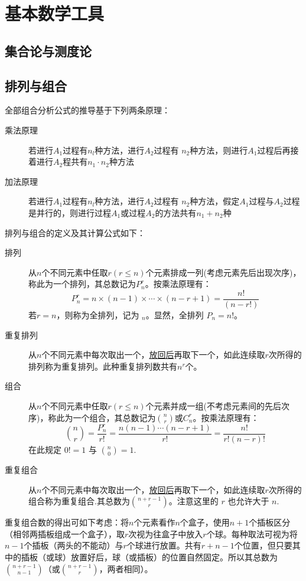 \chapter{基本数学工具}

\section{集合论与测度论}



\section{排列与组合}

全部组合分析公式的推导基于下列两条原理：
\begin{description}
  \item[乘法原理] 若进行$A_1$过程有$n_l$种方法，进行$A_2$过程有 $n_2$种方法，则进行$A_1$过程后再接着进行$A_2$程共有$n_1 \cdot  n_2$种方法
  \item[加法原理] 若进行$A_1$过程有$n_l$种方法，进行$A_2$过程有 $n_2$种方法，假定$A_1$过程与$A_2$过程是并行的，则进行过程$A_1$或过程$A_2$的方法共有$n_1 +n_2$种
\end{description}

排列与组合的定义及其计算公式如下：
\begin{description}
  \item[排列] 从$n$个不同元素中任取$r (r \le n)$个元素排成一列(考虑元素先后出现次序)，称此为一个排列，其总数记为$P_n^r$。按乘法原理有：
    \[ P_n^r = n \times (n - 1) \times \dotsb \times (n - r + 1) = \frac{n!}{(n - r!)} \]
    若$r = n$，则称为全排列，记为 $_n$。显然，全排列 $P_n = n!$。
  \item[重复排列] 从$n$个不同元素中每次取出一个，\underline{放回后}再取下一个，如此连续取$r$次所得的排列称为重复排列。此种重复排列数共有$n^r$个。
  \item[组合] 从$n$个不同元素中任取$r (r \le n)$个元素并成一组(不考虑元素间的先后次序)，称此为一个组合，其总数记为$\binom{n}{r}$或$C_n^r$。按乘法原理有：
    \[ \binom{n}{r} = \frac{P_n^r}{r!} = \frac{n (n - 1) \dotsb (n - r + 1)}{r!} = \frac{n!}{r! (n - r)!} \]
    在此规定 $0! = 1$ 与 $\binom{n}{0} = 1$.
  \item[重复组合] 从$n$个不同元素中每次取出一个，\underline{放回后}再取下一个，如此连续取$r$次所得的组合称为重复组合.其总数为$\binom{n + r - 1}{r}$。注意这里的 $r$ 也允许大于 $n$.
\end{description}

重复组合数的得出可如下考虑：将$n$个元素看作$n$个盒子，使用$n+1$个插板区分（相邻两插板组成一个盒子），取$r$次视为往盒子中放入$r$个球。每种取法可视为将$n-1$个插板（两头的不能动）与$r$个球进行放置。共有$r+n-1$个位置，但只要其中的插板（或球）放置好后，球（或插板）的位置自然固定。所以其总数为$\binom{n + r - 1}{n-1}$（或$\binom{n + r - 1}{r}$，两者相同）。

